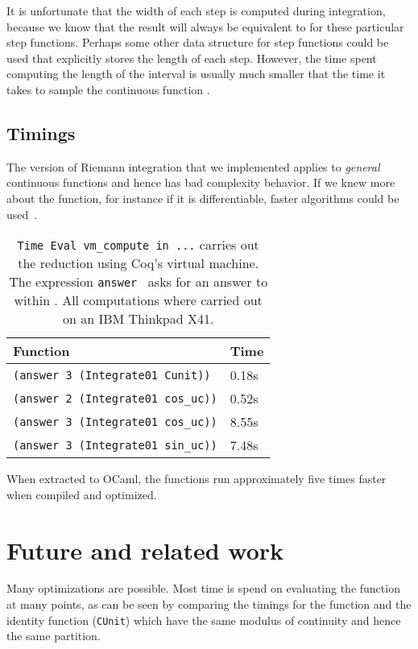 \documentclass{elsarticle}
\newcommand{\tmstrong}[1]{\textbf{#1}}
\newcommand{\tmtextit}[1]{{\itshape{#1}}}
\begin{document}
It is unfortunate that the width of each step is computed during integration,
because we know that the result will always be equivalent to  for
these particular step functions. Perhaps some other data structure for step
functions could be used that explicitly stores the length of each step.
However, the time spent computing the length of the interval is usually much
smaller that the time it takes to sample the continuous function .

\subsection{Timings}The version of Riemann integration that we implemented
applies to \tmtextit{general} continuous functions and hence has bad
complexity behavior. If we knew more about the function, for instance if it is
differentiable, faster algorithms could be used~{\cite{edalat:1999}}.

\begin{table}[h]
\begin{center}
  \begin{tabular}{|l|l|}
    \hline
    {\tmstrong{Function}} & {\tmstrong{Time}}\\
    \hline
    {\texttt{(answer 3 (Integrate01 Cunit))}} & 0.18s\\
    \hline
    {\texttt{(answer 2 (Integrate01 cos\_uc))}} & 0.52s\\
    \hline
    {\texttt{(answer 3 (Integrate01 cos\_uc))}} & 8.55s\\
    \hline
    {\texttt{(answer 3 (Integrate01 sin\_uc))}} & 7.48s\\
    \hline
  \end{tabular}
\end{center}
  \caption{{\texttt{Time Eval vm\_compute in ...}} carries out the reduction
  using Coq's virtual machine. The expression {\texttt{answer }} asks for an
  answer to within . All computations where carried out on an IBM
  Thinkpad X41.}
\end{table}

When extracted to OCaml, the functions run approximately five times faster
when compiled and optimized.

\section{Future and related work}

Many optimizations are possible. Most time is spend on evaluating the function
at many points, as can be seen by comparing the timings for the
 function and the identity function ({\texttt{CUnit}}) which
have the same modulus of continuity and hence the same partition.
\end{document}
